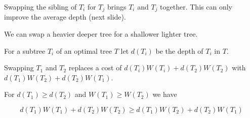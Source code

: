 \vfill
Swapping the sibling of $T_i$ for $T_j$ brings $T_i$ and $T_j$ together.  This can only improve the average depth (next slide).


We can swap a heavier deeper tree for a shallower lighter tree.

\vfill
For a subtree $T_i$ of an optimal tree $T$ let $d(T_i)$ be the depth of $T_i$ in $T$.

Swapping $T_1$ and $T_2$ replaces a cost of $d(T_i)W(T_i) + d(T_2)W(T_2)$ with $d(T_1)W(T_2) + d(T_2)W(T_1)$.

\vfill
For $d(T_1) \geq d(T_2)$ and $W(T_1) \geq W(T_2)$ we have

\vfill
$$d(T_1)W(T_1) + d(T_2)W(T_2) \geq d(T_1)W(T_2) + d(T_2)W(T_1)$$
